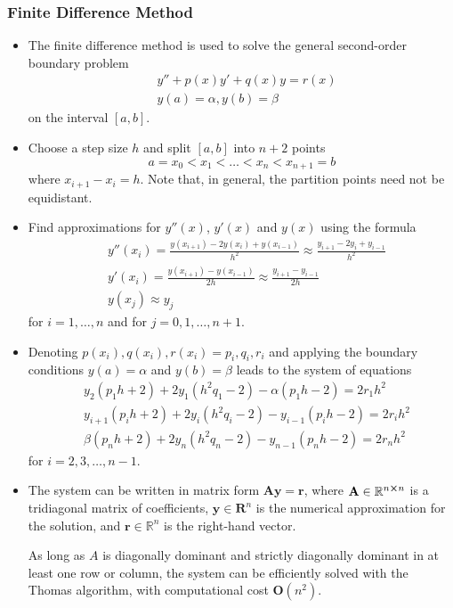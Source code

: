 \documentclass[11pt, a4paper]{article}
\newcommand{\R}{\mathbb{R}} %
\newcommand{\mat}[1]{\mathbf{#1}} %
\begin{document}
\subsubsection{Finite Difference Method}
\begin{itemize}
	\item The finite difference method is used to solve the general second-order boundary problem
	\begin{align*}
		&y'' + p(x)y' + q(x) y = r(x)\\
		&y(a) = \alpha, y(b) = \beta
	\end{align*}
	 on the interval $ [a, b] $.
	
	\item Choose a step size $ h $ and split $ [a, b] $ into $ n+2 $ points
	\begin{equation*}
		a = x_0 < x_1 < \dots < x_{n} < x_{n+1} = b
	\end{equation*}
	where $ x_{i+1} - x_{i} = h$. Note that, in general, the partition points need not be equidistant.
	
	\item Find approximations for $ y''(x) $, $ y'(x) $ and $ y (x)$ using the formula
	\begin{align*}
		&y''(x_{i}) = \frac{y(x_{i+1}) - 2y(x_{i}) + y(x_{i-1})}{h^{2}} \approx \frac{y_{i+1} - 2y_{i} + y_{i-1}}{h^{2}} \\
		&y'(x_{i}) = \frac{y(x_{i+1})-y(x_{i-1})}{2h} \approx  \frac{y_{i+1}-y_{i-1}}{2h}\\
		&y(x_{j}) \approx y_{j}
	\end{align*}
	for $ i = 1, \ldots, n $ and for $ j = 0, 1, \ldots, n+1 $.
	
	\item Denoting $ p(x_{i}), q(x_{i}), r(x_{i}) = p_{i}, q_{i}, r_{i} $ and applying the boundary conditions $ y(a) = \alpha $ and $ y(b) = \beta $ leads to the system of equations
	\begin{align*}
		&y_{2}(p_{1}h + 2) + 2y_{1}(h^{2}q_{1} - 2) - \alpha(p_{1}h - 2) = 2 r_{1}h^{2}\\
		&y_{i+1}(p_{i}h + 2) + 2y_{i}(h^{2}q_{i} - 2) - y_{i-1}(p_{i}h - 2) = 2 r_{i}h^{2}\\
		&\beta(p_{n}h + 2) + 2y_{n}(h^{2}q_{n} - 2) - y_{n-1}(p_{n}h - 2) = 2 r_{n}h^{2}
	\end{align*}
	for $ i = 2, 3, \ldots, n-1 $.
	
	\item The system can be written in matrix form $ \mat{A} \bm{y} = \bm{r} $, where $ \mat{A} \in \R^{n \cross n}$ is a tridiagonal matrix of coefficients, $ \bm{y} \in \bm{R}^{n} $ is the numerical approximation for the solution, and $ \bm{r} \in \R^{n} $ is the right-hand vector.
	
	As long as $ A $ is diagonally dominant and strictly diagonally dominant in at least one row or column, the system can be efficiently solved with the Thomas algorithm, with computational cost $ \mat{O}(n^{2}) $.
\end{itemize}
\end{document}
